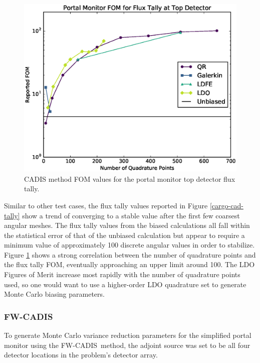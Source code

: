 \documentclass{article} %
\newcommand{\fwc}{\mbox{FW-CADIS}}
\begin{document}
\begin{figure}[!htb]
\centering
\includegraphics[max height=0.445\textheight]{img/portal-cadis-fom.eps}
\caption{CADIS method FOM values for the portal monitor top detector flux tally.}
\label{cargo-cad-fom}
\end{figure}

Similar to other test cases, the flux tally values reported in Figure 
\ref {cargo-cad-tally} show a trend of converging to a stable value after the
first few coarsest angular meshes. The flux tally values from the biased
calculations all fall within the statistical error of that of the unbiased
calculation but appear to require a minimum value of approximately 100
discrete angular values in order to stabilize. Figure \ref{cargo-cad-fom}
shows a strong correlation between the number of quadrature points and the
flux tally FOM, eventually approaching an upper limit around 100. The LDO
Figures of Merit increase most rapidly with the number of quadrature points
used, so one would want to use a higher-order LDO quadrature set to generate
Monte Carlo biasing parameters.

\FloatBarrier
\subsubsection{\fwc}

To generate Monte Carlo variance reduction parameters for the simplified portal
monitor using the \fwc\ method, the adjoint source was set to be all four
detector locations in the problem's detector array.
\end{document}
